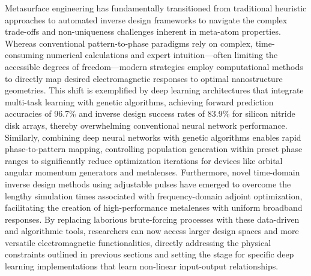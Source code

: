 Metasurface engineering has fundamentally transitioned from traditional heuristic approaches to automated inverse design frameworks to navigate the complex trade-offs and non-uniqueness challenges inherent in meta-atom properties. Whereas conventional pattern-to-phase paradigms rely on complex, time-consuming numerical calculations and expert intuition---often limiting the accessible degrees of freedom---modern strategies employ computational methods to directly map desired electromagnetic responses to optimal nanostructure geometries. This shift is exemplified by deep learning architectures that integrate multi-task learning with genetic algorithms, achieving forward prediction accuracies of 96.7\% and inverse design success rates of 83.9\% for silicon nitride disk arrays, thereby overwhelming conventional neural network performance. Similarly, combining deep neural networks with genetic algorithms enables rapid phase-to-pattern mapping, controlling population generation within preset phase ranges to significantly reduce optimization iterations for devices like orbital angular momentum generators and metalenses. Furthermore, novel time-domain inverse design methods using adjustable pulses have emerged to overcome the lengthy simulation times associated with frequency-domain adjoint optimization, facilitating the creation of high-performance metalenses with uniform broadband responses. By replacing laborious brute-forcing processes with these data-driven and algorithmic tools, researchers can now access larger design spaces and more versatile electromagnetic functionalities, directly addressing the physical constraints outlined in previous sections and setting the stage for specific deep learning implementations that learn non-linear input-output relationships. \citep{doi_10_1016_j_rio_2026_100988_b00ee173} \citep{doi_10_1364_oe_478084_bf365dc5} \citep{doi_10_1109_apmc60911_2024_10867828_7c3f3b13}

